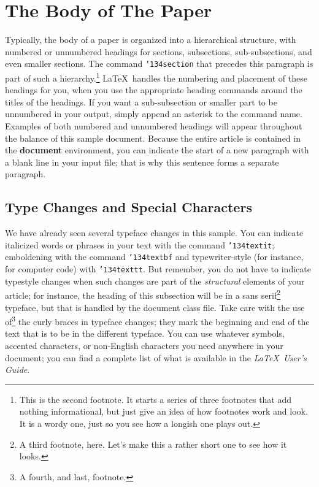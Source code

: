 \documentclass{sig-alternate-05-2015}
\begin{document}
\section{The {\secit Body} of The Paper}
Typically, the body of a paper is organized into a hierarchical structure, with numbered or unnumbered headings for sections, subsections, sub-subsections, and even smaller sections.  The command \texttt{{\char'134}section} that precedes this paragraph is part of such a hierarchy.\footnote{This is the second footnote.  It starts a series of three footnotes that add nothing informational, but just give an idea of how footnotes work and look. It is a wordy one, just so you see how a longish one plays out.} \LaTeX\ handles the numbering and placement of these headings for you, when you use the appropriate heading commands around the titles of the headings.  If you want a sub-subsection or smaller part to be unnumbered in your output, simply append an asterisk to the command name.  Examples of both numbered and unnumbered headings will appear throughout the balance of this sample document. 
Because the entire article is contained in the \textbf{document} environment, you can indicate the start of a new paragraph with a blank line in your input file; that is why this sentence forms a separate paragraph. 

\subsection{Type Changes and {\subsecit Special} Characters}
We have already seen several typeface changes in this sample. You can indicate italicized words or phrases in your text with the command \texttt{{\char'134}textit}; emboldening with the command \texttt{{\char'134}textbf} and typewriter-style (for instance, for computer code) with \texttt{{\char'134}texttt}.  But remember, you do not have to indicate typestyle changes when such changes are part of the \textit{structural} elements of your article; for instance, the heading of this subsection will be in a sans serif\footnote{A third footnote, here. Let's make this a rather short one to see how it looks.} typeface, but that is handled by the document class file. Take care with the use of\footnote{A fourth, and last, footnote.}  the curly braces in typeface changes; they mark the beginning and end of the text that is to be in the different typeface. 
You can use whatever symbols, accented characters, or non-English characters you need anywhere in your document; you can find a complete list of what is available in the \textit{\LaTeX\ User's Guide}\cite{Lamport:LaTeX}.
\end{document}
